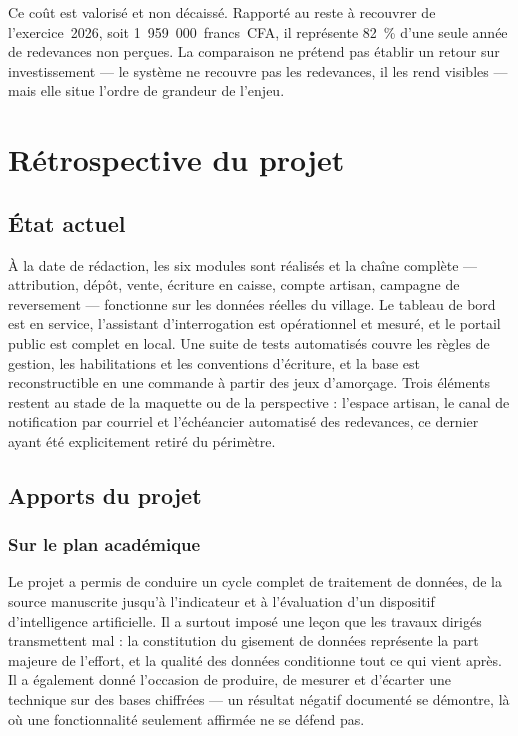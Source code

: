 Ce coût est valorisé et non décaissé. Rapporté au reste à recouvrer de l'exercice~2026, soit 1~959~000~francs~CFA, il représente 82~\% d'une seule année de redevances non perçues. La comparaison ne prétend pas établir un retour sur investissement --- le système ne recouvre pas les redevances, il les rend visibles --- mais elle situe l'ordre de grandeur de l'enjeu.

\section{Rétrospective du projet}
\label{sec:4-4}

\subsection{État actuel}

À la date de rédaction, les six modules sont réalisés et la chaîne complète --- attribution, dépôt, vente, écriture en caisse, compte artisan, campagne de reversement --- fonctionne sur les données réelles du village. Le tableau de bord est en service, l'assistant d'interrogation est opérationnel et mesuré, et le portail public est complet en local. Une suite de tests automatisés couvre les règles de gestion, les habilitations et les conventions d'écriture, et la base est reconstructible en une commande à partir des jeux d'amorçage. Trois éléments restent au stade de la maquette ou de la perspective : l'espace artisan, le canal de notification par courriel et l'échéancier automatisé des redevances, ce dernier ayant été explicitement retiré du périmètre.

\subsection{Apports du projet}

\subsubsection{Sur le plan académique}

Le projet a permis de conduire un cycle complet de traitement de données, de la source manuscrite jusqu'à l'indicateur et à l'évaluation d'un dispositif d'intelligence artificielle. Il a surtout imposé une leçon que les travaux dirigés transmettent mal : la constitution du gisement de données représente la part majeure de l'effort, et la qualité des données conditionne tout ce qui vient après. Il a également donné l'occasion de produire, de mesurer et d'écarter une technique sur des bases chiffrées --- un résultat négatif documenté se démontre, là où une fonctionnalité seulement affirmée ne se défend pas.

